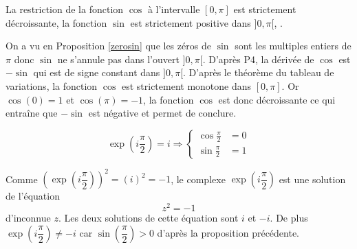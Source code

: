 \begin{propn}\label{varcos}
 La restriction de la fonction $\cos$ à l'intervalle $[0,\pi]$ est strictement décroissante, la fonction $\sin$ est strictement positive dans $]0,\pi[$, .
\end{propn}
\begin{demo}
 On a vu en Proposition \ref{zerosin} que les zéros de $\sin$ sont les multiples entiers de $\pi$ donc $\sin$ ne s'annule pas dans l'ouvert $]0,\pi[$. D'après P4, la dérivée de $\cos$ est $-\sin$ qui est de signe constant dans $]0,\pi[$. D'après le théorème du tableau de variations, la fonction $\cos$ est strictement monotone dans $[0,\pi]$. Or $\cos(0)=1$ et $\cos(\pi)=-1$, la fonction $\cos$ est donc décroissante ce qui entraîne que $-\sin$ est négative et permet de conclure.
\end{demo}

\begin{propn}
 \begin{displaymath}
 \exp(i\dfrac{\pi}{2})= i \Rightarrow
 \left\lbrace 
 \begin{aligned}
   \cos \frac{\pi}{2} &= 0 \\ \sin \frac{\pi}{2} &= 1
 \end{aligned}
\right. 
\end{displaymath}
\end{propn}
\begin{demo}
 Comme $(\exp(i\dfrac{\pi}{2}))^2=(i)^2=-1$, le complexe $\exp(i\dfrac{\pi}{2})$ est une solution de l'équation
\begin{displaymath}
 z^2=-1
\end{displaymath}
d'inconnue $z$. Les deux solutions de cette équation sont $i$ et $-i$. De plus $\exp(i\dfrac{\pi}{2})\neq -i$ car $\sin(\dfrac{\pi}{2})> 0$ d'après la proposition précédente.
\end{demo}

